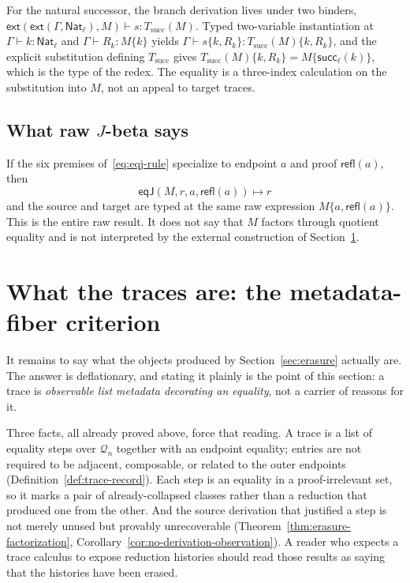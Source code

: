 \documentclass[10pt,reqno]{amsart}
\newcommand{\Ext}[2]{\mathsf{ext}(#1,#2)}
\newcommand{\NatTy}{\mathsf{Nat}}
\newcommand{\Succ}{\mathsf{succ}}
\newcommand{\Refl}{\mathsf{refl}}
\newcommand{\EqJ}{\mathsf{eqJ}}
\newcommand{\red}{\mathrel{\longmapsto}}
\newcommand{\Q}{\mathcal{Q}}
\begin{document}
For the natural successor, the branch derivation lives under two binders,
\(\Ext{\Ext{\Gamma}{\NatTy_\ell}}{M}\vdash s:T_{\mathrm{succ}}(M)\).  Typed
two-variable instantiation at \(\Gamma\vdash k:\NatTy_\ell\) and
\(\Gamma\vdash R_k:M\{k\}\) yields
\(\Gamma\vdash s\{k,R_k\}:T_{\mathrm{succ}}(M)\{k,R_k\}\), and the explicit
substitution defining \(T_{\mathrm{succ}}\) gives
\(T_{\mathrm{succ}}(M)\{k,R_k\}=M\{\Succ_\ell(k)\}\), which is the type of the
redex.  The equality is a three-index calculation on the substitution into
\(M\), not an appeal to target traces.

\subsection{\texorpdfstring{What raw \(J\)-beta says}{What raw J-beta says}}

If the six premises of~\eqref{eq:eqj-rule} specialize to endpoint \(a\) and
proof \(\Refl(a)\), then
\[
             \EqJ(M,r,a,\Refl(a))\red r
\]
and the source and target are typed at the same raw expression
\(M\{a,\Refl(a)\}\).  This is the entire raw result.  It does not say that
\(M\) factors through quotient equality and is not interpreted by the
external construction of Section~\ref{sec:j-boundary}.

\section{\texorpdfstring{What the traces are: the metadata-fiber criterion}
{What the traces are: the metadata-fiber criterion}}
\label{sec:j-boundary}

It remains to say what the objects produced by Section~\ref{sec:erasure}
actually are.  The answer is deflationary, and stating it plainly is the point
of this section: a trace is \emph{observable list metadata decorating an
equality}, not a carrier of reasons for it.

Three facts, all already proved above, force that reading.  A trace is a list of
equality steps over \(\Q_n\) together with an endpoint equality; entries are not
required to be adjacent, composable, or related to the outer endpoints
(Definition~\ref{def:trace-record}).  Each step is an equality in a
proof-irrelevant set, so it marks a pair of already-collapsed classes rather
than a reduction that produced one from the other.  And the source derivation
that justified a step is not merely unused but provably unrecoverable
(Theorem~\ref{thm:erasure-factorization},
Corollary~\ref{cor:no-derivation-observation}).  A reader who expects a trace
calculus to expose reduction histories should read those results as saying that
the histories have been erased.
\end{document}
